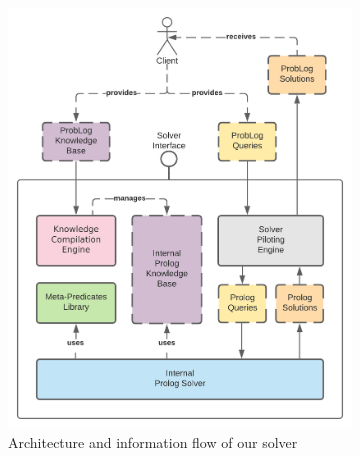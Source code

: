 \documentclass[12pt,a4paper,openright,twoside]{book}
\begin{document}
\begin{figure}[t]
    \centering
    \caption[Architecture of our \problog{} solver, with a focus on the KB recompilation step]{Architecture of our \problog{} solver (left), with a focus on the KB recompilation step (right)}
    \label{fig:design-problog-architecture-and-kb-recompilation}
    \begin{subfigure}{0.49\linewidth}
        \includegraphics[width=\linewidth]{figures/design-problog-architecture.pdf}
        \caption{Architecture and information flow of our \problog{} solver}
        \label{fig:design-problog-architecture}
    \end{subfigure}
    \hfill
    \begin{subfigure}{0.49\linewidth}

\end{subfigure}
\end{figure}
\end{document}
